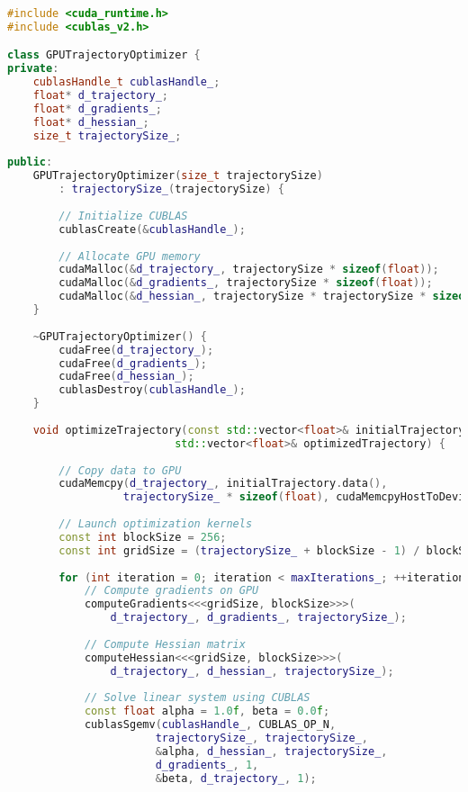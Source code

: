 \begin{lstlisting}[language=C++, caption=CUDA-Accelerated Trajectory Optimization]
#include <cuda_runtime.h>
#include <cublas_v2.h>

class GPUTrajectoryOptimizer {
private:
    cublasHandle_t cublasHandle_;
    float* d_trajectory_;
    float* d_gradients_;
    float* d_hessian_;
    size_t trajectorySize_;
    
public:
    GPUTrajectoryOptimizer(size_t trajectorySize) 
        : trajectorySize_(trajectorySize) {
        
        // Initialize CUBLAS
        cublasCreate(&cublasHandle_);
        
        // Allocate GPU memory
        cudaMalloc(&d_trajectory_, trajectorySize * sizeof(float));
        cudaMalloc(&d_gradients_, trajectorySize * sizeof(float));
        cudaMalloc(&d_hessian_, trajectorySize * trajectorySize * sizeof(float));
    }
    
    ~GPUTrajectoryOptimizer() {
        cudaFree(d_trajectory_);
        cudaFree(d_gradients_);
        cudaFree(d_hessian_);
        cublasDestroy(cublasHandle_);
    }
    
    void optimizeTrajectory(const std::vector<float>& initialTrajectory,
                          std::vector<float>& optimizedTrajectory) {
        
        // Copy data to GPU
        cudaMemcpy(d_trajectory_, initialTrajectory.data(),
                  trajectorySize_ * sizeof(float), cudaMemcpyHostToDevice);
        
        // Launch optimization kernels
        const int blockSize = 256;
        const int gridSize = (trajectorySize_ + blockSize - 1) / blockSize;
        
        for (int iteration = 0; iteration < maxIterations_; ++iteration) {
            // Compute gradients on GPU
            computeGradients<<<gridSize, blockSize>>>(
                d_trajectory_, d_gradients_, trajectorySize_);
            
            // Compute Hessian matrix
            computeHessian<<<gridSize, blockSize>>>(
                d_trajectory_, d_hessian_, trajectorySize_);
            
            // Solve linear system using CUBLAS
            const float alpha = 1.0f, beta = 0.0f;
            cublasSgemv(cublasHandle_, CUBLAS_OP_N,
                       trajectorySize_, trajectorySize_,
                       &alpha, d_hessian_, trajectorySize_,
                       d_gradients_, 1,
                       &beta, d_trajectory_, 1);
            

\end{lstlisting}
